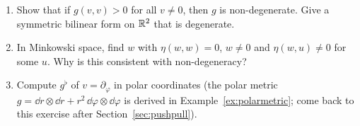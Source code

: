 \begin{exercises}
\begin{enumerate}[nosep]
\item Show that if $g(v,v)>0$ for all $v\neq0$, then $g$ is non-degenerate. Give a symmetric bilinear form on $\mathbb{R}^2$ that is degenerate.
\item In Minkowski space, find $w$ with $\eta(w,w)=0$, $w\ne0$ and $\eta(w,u)\neq0$ for some $u$. Why is this consistent with non-degeneracy?
\item Compute $g^\flat$ of $v=\partial_\varphi$ in polar coordinates (the polar metric $g=\dd r\otimes\dd r+r^2\,\dd\varphi\otimes\dd\varphi$ is derived in Example~\ref{ex:polarmetric}; come back to this exercise after Section~\ref{sec:pushpull}).
\end{enumerate}
\end{exercises}

